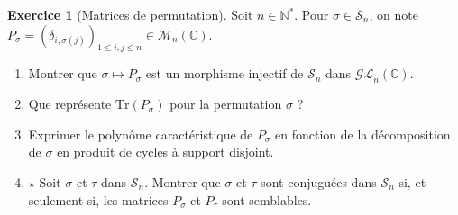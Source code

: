 \documentclass[french]{article}
\newcommand{\N}{\mathbb{N}}
\newcommand{\C}{\mathbb{C}}
\newcommand{\st}{^*}
\newcommand{\Tr}{\text{Tr}}
\theoremstyle{definition}
\newtheorem{exo}{Exercice}
\begin{document}
\begin{exo}[Matrices de permutation]
	Soit $n\in\N\st$. Pour $\sigma\in\mathcal{S}_n$, on note $P_\sigma=(\delta_{i,\sigma(j)})_{1\leqslant i,j\leqslant n}\in\mathcal{M}_n(\C)$.
	\begin{enumerate}
		\item Montrer que $\sigma\mapsto P_\sigma$ est un morphisme injectif de $\mathcal{S}_n$ dans $\mathcal{GL}_n(\C)$.
		\item Que représente $\Tr(P_\sigma)$ pour la permutation $\sigma$ ?
		\item Exprimer le polynôme caractéristique de $P_\sigma$ en fonction de la décomposition de $\sigma$ en produit de cycles à support disjoint.
		\item $\star$ Soit $\sigma$ et $\tau$ dans $\mathcal{S}_n$. Montrer que $\sigma$ et $\tau$ sont conjuguées dans $\mathcal{S}_n$ si, et seulement si, les matrices $P_\sigma$ et $P_\tau$ sont semblables.
	\end{enumerate}
\end{exo}
\end{document}
